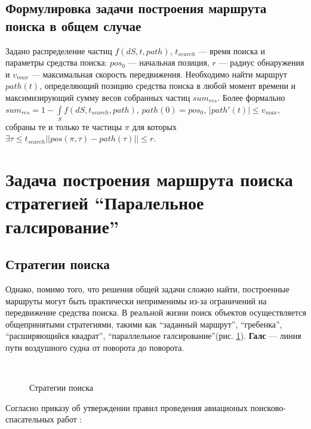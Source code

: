 \FloatBarrier
\subsection{Формулировка задачи построения маршрута поиска 
в общем случае}
Задано распределение частиц $f(dS, t, path)$, $t_{search}$ --- время поиска
и параметры средства поиска: $pos_0$ --- начальная позиция, $r$ --- радиус обнаружения и 
$v_{max}$ --- максимальная скорость передвижения.
 Необходимо найти маршрут $path(t)$, определяющий
позицию средства поиска в любой момент времени и максимизирующий сумму весов собранных
частиц $sum_{res}$.
Более формально $sum_{res}=1-\int\limits_Sf(dS, t_{search}, path)$, $path(0)=pos_0$,
 $|path'(t)|\le v_{max}$, собраны те и только те частицы
 $\pi$ для которых $\exists \tau\le t_{search} ||pos(\pi, \tau)-path(\tau)|| \le r$. 
\FloatBarrier
\section{Задача построения маршрута поиска
 стратегией ``Паралельное галсирование''}

\subsection{Стратегии поиска}
Однако, помимо того, что решения общей задачи сложно найти, построенные маршруты могут быть
практически неприменимы из-за ограничений на передвижение средства поиска. В реальной жизни
поиск объектов осуществляется общепринятыми стратегиями, такими как ``заданный маршрут'',
``гребенка'', ``расширяющийся квадрат'',
``параллельное галсирование''(рис. \ref{strat:subfigures}).
\textbf{Галс} --- линия пути воздушного судна от поворота до поворота.
\begin{figure}[ht]
  \begin{center}
    \\
  \end{center}
 \caption{Стратегии поиска}
 \label{strat:subfigures}
\end{figure}

Согласно приказу об утверждении правил проведения авиационых поисково-спасательных работ
\cite{napss90}:


